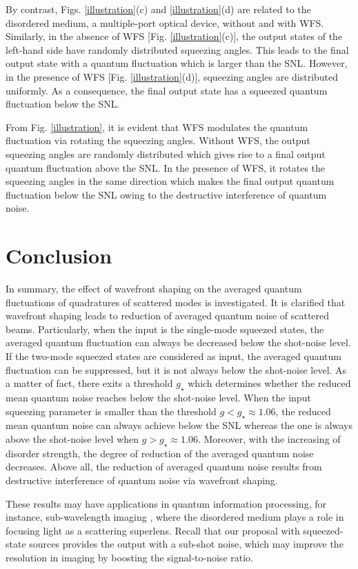 \documentclass[9pt,twocolumn,twoside]{osajnl}
\begin{document}
By contrast, Figs. \ref{illustration}(c) and \ref{illustration}(d) are related to the disordered medium, a multiple-port optical device, without and with WFS. Similarly, in the absence of WFS [Fig. \ref{illustration}(c)], the output states of the left-hand side have randomly distributed squeezing angles. This leads to the final output state with a quantum fluctuation which is larger than the SNL. However, in the presence of WFS [Fig. \ref{illustration}(d)], squeezing angles are distributed uniformly. As a consequence, the final output state has a squeezed quantum fluctuation below the SNL.

From Fig. \ref{illustration}, it is evident that WFS modulates the quantum fluctuation via rotating the squeezing angles. Without WFS, the output squeezing angles are randomly distributed which gives rise to a final output quantum fluctuation above the SNL. In the presence of WFS, it rotates the squeezing angles in the same direction which makes the final output quantum fluctuation below the SNL owing to the destructive interference of quantum noise.

\section{Conclusion}
In summary, the effect of wavefront shaping on the averaged quantum fluctuations of quadratures of scattered modes is investigated. It is clarified that wavefront shaping leads to reduction of averaged quantum noise of scattered beams. Particularly, when the input is the single-mode squeezed states, the averaged quantum fluctuation can always be decreased below the shot-noise level. If the two-mode squeezed states are considered as input, the averaged quantum fluctuation can be suppressed, but it is not always below the shot-noise level. As a matter of fact, there exits a threshold $g_{\star}$ which determines whether the reduced mean quantum noise reaches below the shot-noise level. When the input squeezing parameter is smaller than the threshold $g < g_{\star} \approx 1.06$, the reduced mean quantum noise can always achieve below the SNL whereas the one is always above the shot-noise level when $g > g_{\star} \approx 1.06$. Moreover, with the increasing of disorder strength, the degree of reduction of the averaged quantum noise decreases. Above all, the reduction of averaged quantum noise results from destructive interference of quantum noise via wavefront shaping. 

These results may have applications in quantum information processing, for instance, sub-wavelength imaging \cite{putten2011,park2014,jang2018,chen2018}, where the disordered medium plays a role in focusing light as a scattering superlens. Recall that our proposal with squeezed-state sources provides the output with a sub-shot noise, which may improve the resolution in imaging by boosting the signal-to-noise ratio.
\end{document}
